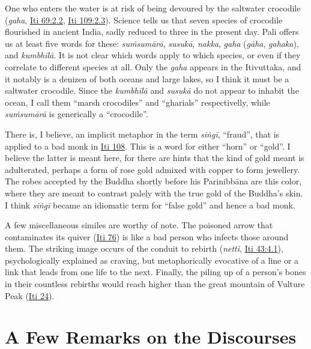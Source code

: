 \documentclass[12pt,openany]{book}%
\begin{document}
One who enters the water is at risk of being devoured by the saltwater crocodile (\emph{gaha}, \href{https://suttacentral.net/iti69/en/sujato\#2.2}{Iti 69:2.2}, \href{https://suttacentral.net/iti109/en/sujato\#2.3}{Iti 109:2.3}). Science tells us that seven species of crocodile flourished in ancient India, sadly reduced to three in the present day. Pali offers us at least five words for these: \emph{\textsanskrit{suṁsumārā}}, \emph{\textsanskrit{susukā}}, \emph{nakka}, \emph{gaha} (\emph{\textsanskrit{gāha}},  \emph{gahaka}), and \emph{\textsanskrit{kumbhīlā}}. It is not clear which words apply to which species, or even if they correlate to different species at all. Only the \emph{gaha} appears in the Itivuttaka, and it notably is a denizen of both oceans and large lakes, so I think it must be a saltwater crocodile. Since the  \emph{\textsanskrit{kumbhīlā}} and \emph{\textsanskrit{susukā}} do not appear to inhabit the ocean, I call them “marsh crocodiles” and “gharials” respectivelly, while \emph{\textsanskrit{suṁsumārā}} is generically a “crocodile”.

There is, I believe, an implicit metaphor in the term \emph{\textsanskrit{siṅgī}}, “fraud”, that is applied to a bad monk in \href{https://suttacentral.net/iti108/en/sujato}{Iti 108}. This is a word for either “horn” or “gold”. I believe the latter is meant here, for there are hints that the kind of gold meant is adulterated, perhaps a form of rose gold admixed with copper to form jewellery. The robes accepted by the Buddha shortly before his \textsanskrit{Parinibbāna} are this color, where they are meant to contrast palely with the true gold of the Buddha’s skin. I think \emph{\textsanskrit{siṅgī}} became an idiomatic term for “false gold” and hence a bad monk.

A few miscellaneous similes are worthy of note. The poisoned arrow that contaminates its quiver (\href{https://suttacentral.net/iti76/en/sujato}{Iti 76}) is like a bad person who infects those around them. The striking image occurs of the conduit to rebirth (\emph{netti}, \href{https://suttacentral.net/iti43/en/sujato\#4.1}{Iti 43:4.1}), psychologically explained as craving, but metaphorically evocative of a line or a link that leads from one life to the next. Finally, the piling up of a person’s bones in their countless rebirths would reach higher than the great mountain of Vulture Peak (\href{https://suttacentral.net/iti24/en/sujato}{Iti 24}).

\section*{A Few Remarks on the Discourses}
\end{document}
